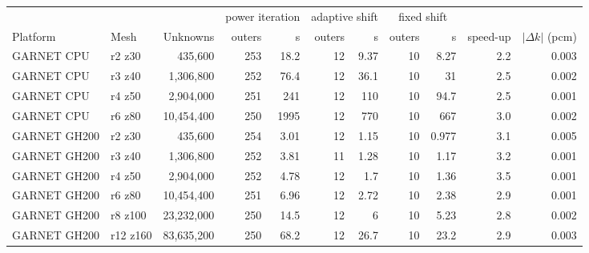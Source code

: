 \begin{tabular}{llr|rr|rr|rr|rr}
\hline
 & & & \multicolumn{2}{c|}{power iteration} & \multicolumn{2}{c|}{adaptive shift} & \multicolumn{2}{c|}{fixed shift} & & \\
Platform & Mesh & Unknowns & outers & s & outers & s & outers & s & speed-up & $|\Delta k|$ (pcm) \\
\hline
GARNET CPU & r2 z30 & 435,600 & 253 & 18.2 & 12 & 9.37 & 10 & 8.27 & 2.2 & 0.003 \\
GARNET CPU & r3 z40 & 1,306,800 & 252 & 76.4 & 12 & 36.1 & 10 & 31 & 2.5 & 0.002 \\
GARNET CPU & r4 z50 & 2,904,000 & 251 & 241 & 12 & 110 & 10 & 94.7 & 2.5 & 0.001 \\
GARNET CPU & r6 z80 & 10,454,400 & 250 & 1995 & 12 & 770 & 10 & 667 & 3.0 & 0.002 \\
GARNET GH200 & r2 z30 & 435,600 & 254 & 3.01 & 12 & 1.15 & 10 & 0.977 & 3.1 & 0.005 \\
GARNET GH200 & r3 z40 & 1,306,800 & 252 & 3.81 & 11 & 1.28 & 10 & 1.17 & 3.2 & 0.001 \\
GARNET GH200 & r4 z50 & 2,904,000 & 252 & 4.78 & 12 & 1.7 & 10 & 1.36 & 3.5 & 0.001 \\
GARNET GH200 & r6 z80 & 10,454,400 & 251 & 6.96 & 12 & 2.72 & 10 & 2.38 & 2.9 & 0.001 \\
GARNET GH200 & r8 z100 & 23,232,000 & 250 & 14.5 & 12 & 6 & 10 & 5.23 & 2.8 & 0.002 \\
GARNET GH200 & r12 z160 & 83,635,200 & 250 & 68.2 & 12 & 26.7 & 10 & 23.2 & 2.9 & 0.003 \\
\hline
\end{tabular}
